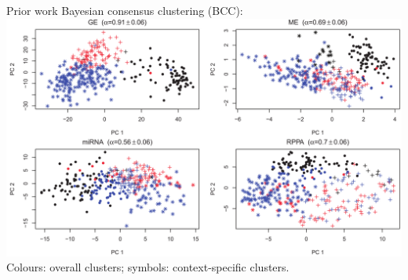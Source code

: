\documentclass[t, final]{beamer}
\begin{document}
\begin{frame}{}
\begin{columns}[t]
\begin{column}{.32\linewidth}
\begin{block}{Prior work}
  Bayesian consensus clustering (BCC): \\
  \includegraphics[width=\textwidth]{Figures/BCC-clusters}
  {
    \tiny
    Colours: overall clusters; symbols: context-specific clusters.
  }

\end{block}


\end{column}
\end{columns}
\end{frame}
\end{document}
